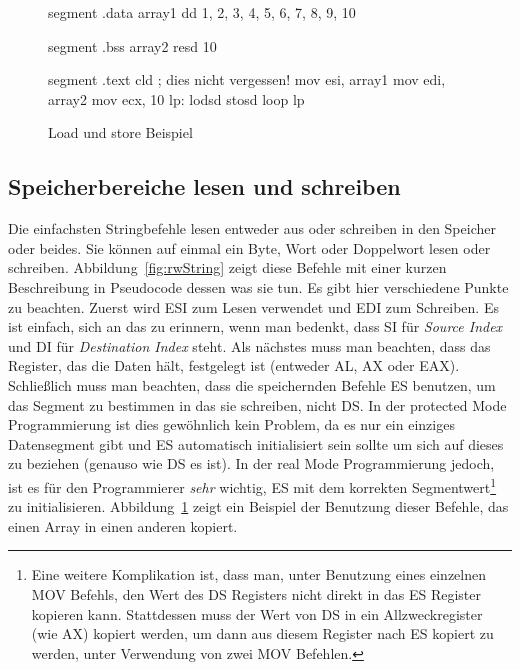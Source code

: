 \begin{figure}[t]
\begin{AsmCodeListing}[frame=single, numbers=left, commandchars=\\\{\}]
 segment .data
 array1  dd     1, 2, 3, 4, 5, 6, 7, 8, 9, 10

 segment .bss
 array2  resd   10

 segment .text
         cld                     ; dies nicht vergessen!
         mov    esi, array1
         mov    edi, array2
         mov    ecx, 10
 lp:                   \label{line:lodEx0}
         lodsd         \label{line:lodEx1}
         stosd         \label{line:lodEx2}
         loop   lp     \label{line:lodEx3}
\end{AsmCodeListing}
\caption{Load und store Beispiel\label{fig:lodEx}}
\end{figure}

\subsection{ Speicherbereiche lesen und schreiben}

Die einfachsten Stringbefehle lesen entweder aus oder schreiben in
den Speicher oder beides. Sie k\"{o}nnen auf einmal ein Byte, Wort oder
Doppelwort lesen oder schreiben. Abbildung~\ref{fig:rwString} zeigt
diese Befehle mit einer kurzen Beschreibung in Pseudocode dessen was
sie tun. Es gibt hier verschiedene Punkte zu beachten. Zuerst wird
ESI zum Lesen verwendet und EDI zum Schreiben. Es ist einfach, sich
an das zu erinnern, wenn man bedenkt, dass SI f\"{u}r \emph{Source
Index} und DI f\"{u}r \emph{Destination Index} 
steht. Als n\"{a}chstes muss man beachten, dass das Register, das die
Daten h\"{a}lt, festgelegt ist (entweder AL, AX oder EAX). Schlie{\ss}lich
muss man beachten, dass die speichernden Befehle ES benutzen, um das
Segment zu bestimmen in das sie schreiben, nicht DS\@. In der
protected Mode Programmierung ist dies gew\"{o}hnlich kein Problem, da
es nur ein einziges Datensegment gibt und ES automatisch
initialisiert sein sollte um sich auf dieses zu beziehen (genauso
wie DS es ist). In der real Mode Programmierung jedoch, ist es f\"{u}r
den Programmierer \emph{sehr} wichtig, ES mit dem korrekten
 Segmentwert\footnote{Eine weitere
Komplikation ist, dass man, unter Benutzung eines einzelnen {\code
MOV} Befehls, den Wert des DS Registers nicht direkt in das ES
Register kopieren kann. Stattdessen muss der Wert von DS in ein
Allzweckregister (wie AX) kopiert werden, um dann aus diesem
Register nach ES kopiert zu werden, unter Verwendung von zwei {\code
MOV} Befehlen.} zu initialisieren. Abbildung~\ref{fig:lodEx} zeigt
ein Beispiel der Benutzung dieser Befehle, das einen Array in einen
anderen kopiert.

